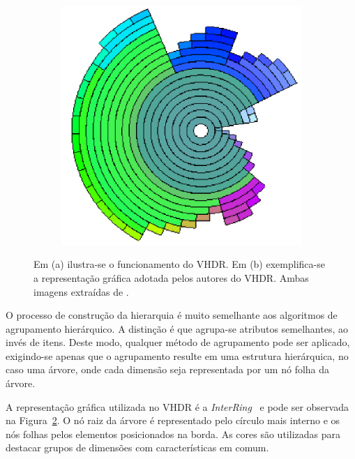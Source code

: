 \begin{figure}[h!]
\begin{subfigure}[b]{0.5\textwidth}
    \includegraphics[width=\textwidth]{images/vhdr2.png}
    \caption{}
    \label{fig:vhdr2}
  \end{subfigure} \caption[VHDR: Visual Hierarchical
  Dimension Reduction]{Em (a) ilustra-se o funcionamento do
  VHDR. Em (b) exemplifica-se a representação gráfica adotada pelos
  autores do VHDR. Ambas imagens extraídas de
  \cite{Yang2003}.}
\end{figure}

O processo de construção da hierarquia é muito semelhante
aos algoritmos de agrupamento hierárquico. A distinção é que
agrupa-se atributos semelhantes, ao invés de itens. Deste
modo, qualquer método de agrupamento pode ser aplicado,
exigindo-se apenas que o agrupamento resulte em uma
estrutura hierárquica, no caso uma árvore, onde cada
dimensão seja representada por um nó folha da árvore. 

A representação gráfica utilizada no VHDR é a
\emph{InterRing}~\cite{Yang2002} e pode
ser observada na Figura~\ref{fig:vhdr2}. O nó raiz da árvore
é representado pelo círculo mais interno e os nós folhas
pelos elementos posicionados na borda. As cores são
utilizadas para destacar grupos de dimensões com
características em comum. 

